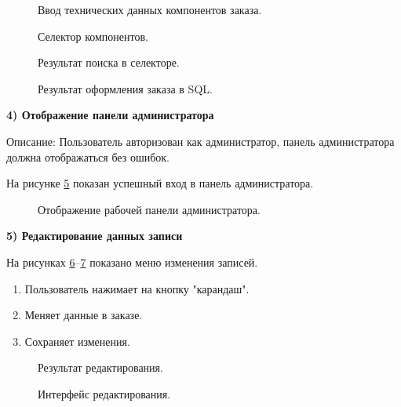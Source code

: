 \begin{figure}[ht]
	\caption{Ввод технических данных компонентов заказа.}
	\label{storedf:form2}
\end{figure}

\begin{figure}[ht]
	\caption{Селектор компонентов.}
	\label{storedf:formsearch0}
\end{figure}

\begin{figure}[ht]
	\caption{Результат поиска в селекторе.}
	\label{storedf:formsearch1}
\end{figure}

\begin{figure}[ht]
	\caption{Результат оформления заказа в SQL.}
	\label{storedf:formgg1}
\end{figure}

\newpage
\textbf{4) Отображение панели администратора}

Описание: Пользователь авторизован как администратор, панель администратора должна отображаться без ошибок. 

На рисунке \ref{storedf:panel0_} показан успешный вход в панель администратора.
\begin{figure}[ht]
	\caption{Отображение рабочей панели администратора.}
	\label{storedf:panel0_}
\end{figure}

\textbf{5) Редактирование данных записи}

На рисунках \ref{storedf:edit1}--\ref{stored:edit0} показано меню изменения записей.
\begin{enumerate}
\item Пользователь нажимает на кнопку "карандаш".
\item Меняет данные в заказе.
\item Сохраняет изменения.
\end{enumerate}

\begin{figure}[ht]
	\caption{Результат редактирования.}
	\label{storedf:edit1}
\end{figure}

\begin{figure}[ht]
	\caption{Интерфейс редактирования.}
	\label{stored:edit0}
\end{figure}

